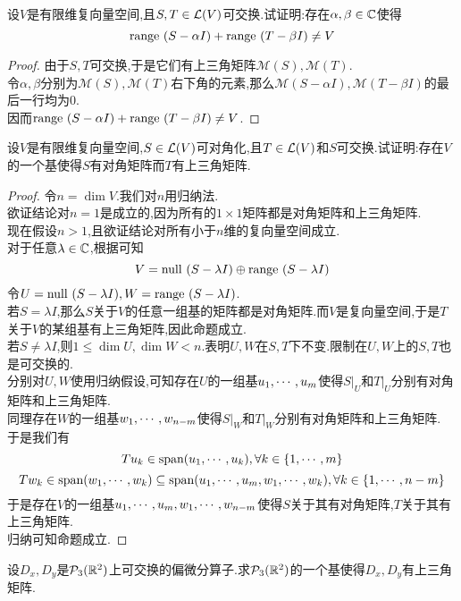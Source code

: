 \documentclass{ctexart}
\begin{document}
\begin{problem}[6.]
    设$V$是有限维复向量空间,且$S,T\in\mathcal{L}(V)$可交换.试证明:存在$\alpha,\beta\in\mathbb{C}$使得
    \[\text{range }(S-\alpha I)+\text{range }(T-\beta I)\neq V\]
\end{problem}
\begin{proof}
    由于$S,T$可交换,于是它们有上三角矩阵$\mathcal{M}(S),\mathcal{M}(T)$.\\
    令$\alpha,\beta$分别为$\mathcal{M}(S),\mathcal{M}(T)$右下角的元素,那么$\mathcal{M}(S-\alpha I),\mathcal{M}(T-\beta I)$的最后一行均为$0$.\\
    因而$\text{range }(S-\alpha I)+\text{range }(T-\beta I)\neq V$.
\end{proof}
\begin{problem}[7.]
    设$V$是有限维复向量空间,$S\in\mathcal{L}(V)$可对角化,且$T\in\mathcal{L}(V)$和$S$可交换.试证明:存在$V$的一个基使得$S$有对角矩阵而$T$有上三角矩阵.
\end{problem}
\begin{proof}
    令$n=\dim V$.我们对$n$用归纳法.\\
    欲证结论对$n=1$是成立的,因为所有的$1\times 1$矩阵都是对角矩阵和上三角矩阵.\\
    现在假设$n>1$,且欲证结论对所有小于$n$维的复向量空间成立.\\
    对于任意$\lambda\in\mathbb{C}$,根据可知
    \[V=\text{null }(S-\lambda I)\oplus\text{range }(S-\lambda I)\]
    令$U=\text{null }(S-\lambda I),W=\text{range }(S-\lambda I)$.\\
    若$S=\lambda I$,那么$S$关于$V$的任意一组基的矩阵都是对角矩阵.而$V$是复向量空间,于是$T$关于$V$的某组基有上三角矩阵,因此命题成立.\\
    若$S\neq\lambda I$,则$1\leqslant \dim U,\dim W<n$.表明$U,W$在$S,T$下不变.限制在$U,W$上的$S,T$也是可交换的.\\
    分别对$U,W$使用归纳假设,可知存在$U$的一组基${u}_1,\cdots,{u}_{m}$使得$S|_U$和$T|_U$分别有对角矩阵和上三角矩阵.\\
    同理存在$W$的一组基${w}_1,\cdots,{w}_{n-m}$使得$S|_W$和$T|_W$分别有对角矩阵和上三角矩阵.\\
    于是我们有
    \[Tu_k\in\text{span}({u}_1,\cdots,{u}_{k}),\forall k\in\{1,\cdots,m\}\]
    \[Tw_k\in\text{span}({w}_1,\cdots,{w}_{k})\subseteq\text{span}({u}_1,\cdots,{u}_{m},{w}_1,\cdots,{w}_{k}),\forall k\in\{1,\cdots,n-m\}\]
    于是存在$V$的一组基${u}_1,\cdots,{u}_{m},{w}_1,\cdots,{w}_{n-m}$使得$S$关于其有对角矩阵,$T$关于其有上三角矩阵.\\
    归纳可知命题成立.
\end{proof}
\begin{problem}[8.]
    设$D_x,D_y$是$\mathcal{P}_3(\mathbb{R}^2)$上可交换的偏微分算子.求$\mathcal{P}_3(\mathbb{R}^2)$的一个基使得$D_x,D_y$有上三角矩阵.
\end{problem}
\end{document}
